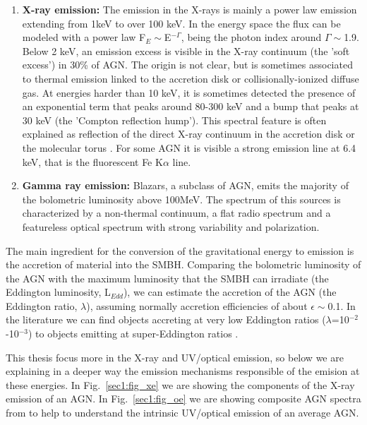 \begin{enumerate}
\item \textbf{X-ray emission:} The emission in the X-rays is mainly a power law emission extending from 1keV to over 100 keV. In the energy space the flux can be modeled with a power law F$_E\sim$E$^{-\Gamma}$, being the photon index around $\Gamma\sim$1.9. Below 2 keV, an emission excess is visible in the X-ray continuum (the ’soft excess’) in 30\% of AGN. The origin is not clear, but is sometimes associated to thermal emission linked to the accretion disk or collisionally-ionized diffuse gas. At energies harder than 10 keV, it is sometimes detected the presence of an exponential term that peaks around 80-300 keV and a bump that peaks at 30 keV (the ’Compton reflection hump’). This spectral feature is often explained as reflection of the direct X-ray continuum in the accretion disk or the molecular torus \citep{turner09}. For some AGN it is visible a strong emission line at 6.4 keV, that is the fluorescent Fe K$\alpha$ line.

\item \textbf{Gamma ray emission:} Blazars, a subclass of AGN, emits the majority of the bolometric luminosity above 100MeV. The spectrum of this sources is characterized by a non-thermal continuum, a flat radio spectrum and a featureless optical spectrum with strong variability and polarization.

\end{enumerate}


The main ingredient for the conversion of the gravitational energy to emission is the accretion of material into the SMBH. Comparing the bolometric luminosity of the AGN with the maximum luminosity that the SMBH can irradiate (the Eddington luminosity, L$_{Edd}$), we can estimate the accretion of the AGN (the Eddington ratio, $\lambda$), assuming normally accretion efficiencies of about $\epsilon\sim$0.1. In the literature we can find objects accreting at very low Eddington ratios ($\lambda$=10$^{-2}$-10$^{-3}$) to objects emitting at super-Eddington ratios \citep{raimundo09}.

This thesis focus more in the X-ray and UV/optical emission, so below we are explaining in a deeper way the emission mechanisms responsible of the emision at these energies. In Fig.~\ref{sec1:fig_xe} we are showing the components of the X-ray emission of an AGN. In Fig.~\ref{sec1:fig_oe} we are showing composite AGN spectra from \cite{shen16} to help to understand the intrinsic UV/optical emission of an average AGN. 


